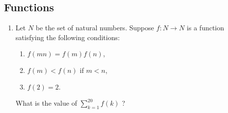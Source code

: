 \documentclass[12pt,-letter paper]{article}
\providecommand{\brak}[1]{\ensuremath{\left(#1\right)}}
\begin{document}
\begin{center}
\section*{Functions}
\end{center}
\begin{enumerate}
\item Let $N$ be the set of natural numbers. Suppose $f : N \rightarrow N$ is a function satisfying the following conditions:
    \begin{enumerate}
	    \item $f\brak{mn} = f\brak{m} f\brak{n}$,
	    \item $f\brak{m} < f\brak{n}$ if $m < n$,
	    \item $f\brak{2} = 2$.
    \end{enumerate}
	What is the value of $\sum_{k=1}^{20} f\brak{k}$ ?
\end{enumerate}
\end{document}
